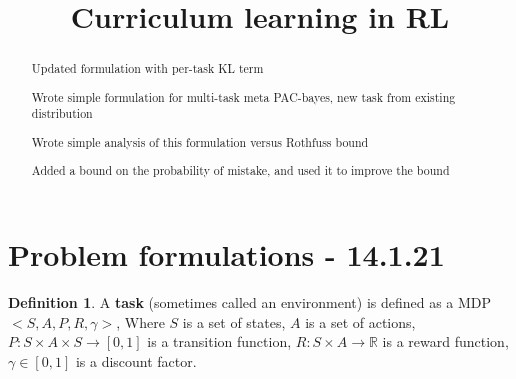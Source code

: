 \documentclass[letterpaper]{article}
\title{Curriculum learning in RL}
\theoremstyle{definition}
\newtheorem{defn}{Definition}[section]
\begin{document}
	
	\maketitle
	\begin{abstract}
		
		Updated formulation with per-task KL term
		
		Wrote simple formulation for multi-task meta PAC-bayes, new task from existing distribution
		
		Wrote simple analysis of this formulation versus Rothfuss bound
		
		Added a bound on the probability of mistake, and used it to improve the bound
	\end{abstract}

\tableofcontents

\section{Problem formulations - 14.1.21} \label{sec:formulation}
\begin{defn}
	A \textbf{task} (sometimes called an environment) is defined as a MDP $<S,A,P,R,\gamma>$,
	Where $S$ is a set of states, $A$ is a set of actions, $P:S\times A\times S\rightarrow [0,1]$ is a transition function, 
	$R:S\times A\rightarrow \mathbb{R}$ is a reward function, $\gamma\in[0,1]$ is a discount factor.
\end{defn}
\end{document}

